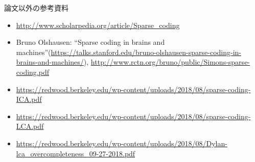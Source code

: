 論文以外の参考資料
\begin{itemize}
\item \url{http://www.scholarpedia.org/article/Sparse_coding}
\item Bruno Olshausen: “Sparse coding in brains and machines”(\url{https://talks.stanford.edu/bruno-olshausen-sparse-coding-in-brains-and-machines/}), \url{http://www.rctn.org/bruno/public/Simons-sparse-coding.pdf}
\item \url{https://redwood.berkeley.edu/wp-content/uploads/2018/08/sparse-coding-ICA.pdf}
\item \url{https://redwood.berkeley.edu/wp-content/uploads/2018/08/sparse-coding-LCA.pdf}
\item \url{https://redwood.berkeley.edu/wp-content/uploads/2018/08/Dylan-lca_overcompleteness_09-27-2018.pdf}
\end{itemize}
